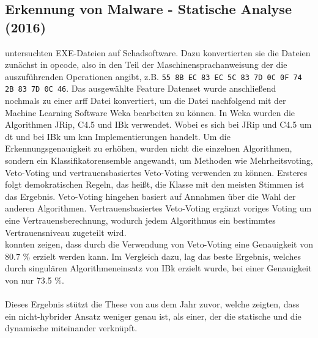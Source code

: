 \documentclass[
    12pt, %
    DIV10,
    ngerman, %
    a4paper, %
    oneside, %
    titlepage, %
    parskip=half, %
    headings=normal, %
    listof=totoc, %
    bibliography=totoc, %
    index=totoc, %
    captions=tableheading, %
    final %
]{scrreprt}
\begin{document}
\subsection{Erkennung von Malware - Statische Analyse (2016)}
\citeauthor{More2016} untersuchten EXE-Dateien auf Schadsoftware. Dazu konvertierten sie die Dateien zunächst in \ac{opcode}, also in den Teil der Maschinensprachanweisung der die auszuführenden Operationen angibt, z.B. \texttt{55 8B EC 83 EC 5C 83 7D 0C 0F 74 2B 83 7D 0C 46}. Das ausgewählte Feature Datenset wurde anschließend nochmals zu einer \ac{arff} Datei konvertiert, um die Datei nachfolgend mit der Machine Learning Software Weka bearbeiten zu können. 
In Weka wurden die Algorithmen JRip, C4.5 und IBk verwendet. Wobei es sich bei JRip und C4.5 um \ac{dt} und bei IBk um \ac{knn} Implementierungen handelt. Um die Erkennungsgenauigkeit zu erhöhen, wurden nicht die einzelnen Algorithmen, sondern ein Klassifikatorensemble angewandt, um Methoden wie Mehrheitsvoting, Veto-Voting und vertrauensbasiertes Veto-Voting verwenden zu können. Ersteres folgt demokratischen Regeln, das heißt, die Klasse mit den meisten Stimmen ist das Ergebnis. Veto-Voting hingehen basiert auf Annahmen über die Wahl der anderen Algorithmen. Vertrauensbasiertes Veto-Voting ergänzt voriges Voting um eine Vertrauensberechnung, wodurch jedem Algorithmus ein bestimmtes Vertrauensniveau zugeteilt wird. \\
\citeauthor{More2016} konnten zeigen, dass durch die Verwendung von Veto-Voting eine Genauigkeit von 80.7 \% erzielt werden kann. Im Vergleich dazu, lag das beste Ergebnis, welches durch singulären Algorithmeneinsatz von IBk erzielt wurde, bei einer Genauigkeit von nur 73.5 \%.\\\\
Dieses Ergebnis stützt die These von \citeauthor{Shijo2015} aus dem Jahr zuvor, welche zeigten, dass ein nicht-hybrider Ansatz weniger genau ist, als einer, der die statische und die dynamische miteinander verknüpft.
\end{document}
